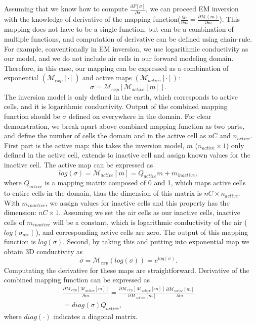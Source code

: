 \documentclass{segabs}
\begin{document}
Assuming that we know how to compute $\frac{\partial F[\sigma]}{\partial \sigma}$, we can proceed EM inversion with the knowledge of derivative of the mapping function($\frac{\partial \sigma}{\partial m} = \frac{\partial \mathcal{M}(m)}{\partial m}$).
This mapping does not have to be a single function, but can be a combination of multiple functions, and computation of derivative can be defined using chain-rule. For example, conventionally in EM inversion, we use logarithmic conductivity as our model, and we do not include air cells in our forward modeling domain. Therefore, in this case, our mapping can be expressed as a combination of exponential $(\mathcal{M}_{exp}[\cdot])$ and active maps $(\mathcal{M}_{active}[\cdot])$:
\begin{equation}
  \sigma = \mathcal{M}_{exp}[\mathcal{M}_{active}[m]].
  \label{eq:combomap1}
\end{equation}
The inversion model is only defined in the earth, which corresponds to active cells, and it is logarithmic conductivity. Output of the combined mapping function should be $\sigma$ defined on everywhere in the domain. For clear demonstration, we break apart above combined mapping function as two parts, and define the number of cells the domain and in the active cell as $nC$ and $n_{active}$. First part is the active map: this takes the inversion model, $m$ ($n_{active}\times 1$) only defined in the active cell, extends to inactive cell and assign known values for the inactive cell. The active map can be expressed as 
\begin{equation}
  log(\sigma) = \mathcal{M}_{active}[m] = Q_{active}m + m_{inactive},
  \label{eq:activemap}
\end{equation}
where $Q_{active}$ is a mapping matrix composed of 0 and 1, which maps active cells to entire cells in the domain, thus the dimension of this matrix is $nC\times n_{active}$. With $m_{inactive}$, we assign values for inactive cells and this property has the dimension: $nC\times 1$. Assuming we set the air cells as our inactive cells, inactive cells of $m_{inactive}$ will be a constant, which is logarithmic conductivity of the air ($log(\sigma_{air})$), and corresponding active cells are zero. The output of this mapping function is $log(\sigma)$. Second, by taking this and putting into exponential map we obtain 3D conductivity as
\begin{equation}
  \sigma = \mathcal{M}_{exp}(log(\sigma)) = e^{log(\sigma)}.
\end{equation}
Computating the derivative for these maps are straightforward. Derivative of the combined mapping function can be expressed as
\begin{eqnarray}
  \frac{\partial \mathcal{M}_{exp}[\mathcal{M}_{active}[m]]}{\partial m}  
  = \frac{\partial \mathcal{M}_{exp}[\mathcal{M}_{active}[m]]}{\partial  \mathcal{M}_{active}[m]}
  \frac{\partial \mathcal{M}_{active}[m]}{\partial  m} \nonumber \\
  = diag(\sigma)Q_{active},
\end{eqnarray}
where $diag(\cdot)$ indicates a diagonal matrix. 
\end{document}
